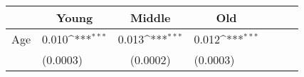 {
\def\sym#1{\ifmmode^{#1}\else\(^{#1}\)\fi}
\begin{tabular*}{.6\hsize}{@{\hskip\tabcolsep\extracolsep\fill}l*{3}{lc}}
\toprule
                &\multicolumn{1}{c}{Young}&\multicolumn{1}{c}{Middle}&\multicolumn{1}{c}{Old}\\
\midrule
Age \hspace{2ex}&    0.010\sym{***}&    0.013\sym{***}&    0.012\sym{***}\\
                & (0.0003)         & (0.0002)         & (0.0003)         \\
\bottomrule
\end{tabular*}
}

